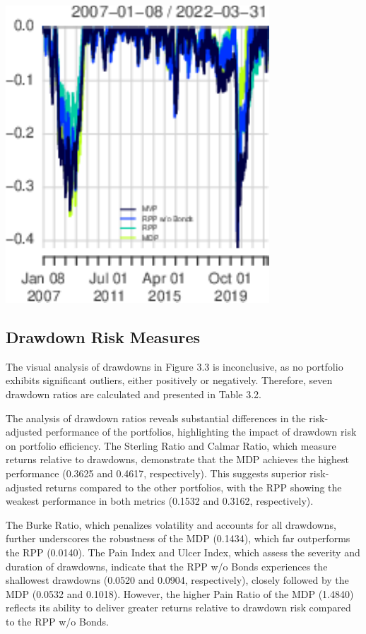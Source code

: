 \documentclass[11pt,preprint]{elsarticle}
\let\origfigure\figure
\let\endorigfigure\endfigure
\renewenvironment{figure}[1][2] {
    \expandafter\origfigure\expandafter[H]
} {
    \endorigfigure
}
\numberwithin{equation}{section}
\numberwithin{figure}{section}
\numberwithin{table}{section}
\begin{document}
\begin{figure}[H]

{\centering \includegraphics{Essay_files/figure-latex/Figure3-1} 

}

\caption{Drawdowns \label{Figure3}}\label{fig:Figure3}
\end{figure}

\subsection{Drawdown Risk Measures}\label{drawdown-risk-measures}

The visual analysis of drawdowns in Figure 3.3 is inconclusive, as no
portfolio exhibits significant outliers, either positively or
negatively. Therefore, seven drawdown ratios are calculated and
presented in Table 3.2.

The analysis of drawdown ratios reveals substantial differences in the
risk-adjusted performance of the portfolios, highlighting the impact of
drawdown risk on portfolio efficiency. The Sterling Ratio and Calmar
Ratio, which measure returns relative to drawdowns, demonstrate that the
MDP achieves the highest performance (0.3625 and 0.4617, respectively).
This suggests superior risk-adjusted returns compared to the other
portfolios, with the RPP showing the weakest performance in both metrics
(0.1532 and 0.3162, respectively).

The Burke Ratio, which penalizes volatility and accounts for all
drawdowns, further underscores the robustness of the MDP (0.1434), which
far outperforms the RPP (0.0140). The Pain Index and Ulcer Index, which
assess the severity and duration of drawdowns, indicate that the RPP w/o
Bonds experiences the shallowest drawdowns (0.0520 and 0.0904,
respectively), closely followed by the MDP (0.0532 and 0.1018). However,
the higher Pain Ratio of the MDP (1.4840) reflects its ability to
deliver greater returns relative to drawdown risk compared to the RPP
w/o Bonds.
\end{document}
